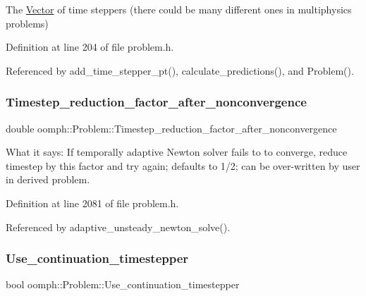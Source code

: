 The \hyperlink{classoomph_1_1Vector}{Vector} of time steppers (there could be many different ones in multiphysics problems) 



Definition at line 204 of file problem.\+h.



Referenced by add\+\_\+time\+\_\+stepper\+\_\+pt(), calculate\+\_\+predictions(), and Problem().

\mbox{\label{classoomph_1_1Problem_a359d1936bc2146e0a0ce697776efcf91}} 
\subsubsection{\texorpdfstring{Timestep\+\_\+reduction\+\_\+factor\+\_\+after\+\_\+nonconvergence}{Timestep\_reduction\_factor\_after\_nonconvergence}}
{\footnotesize\ttfamily double oomph\+::\+Problem\+::\+Timestep\+\_\+reduction\+\_\+factor\+\_\+after\+\_\+nonconvergence\hspace{0.3cm}{\ttfamily [protected]}}



What it says\+: If temporally adaptive Newton solver fails to to converge, reduce timestep by this factor and try again; defaults to 1/2; can be over-\/written by user in derived problem. 



Definition at line 2081 of file problem.\+h.



Referenced by adaptive\+\_\+unsteady\+\_\+newton\+\_\+solve().

\mbox{\label{classoomph_1_1Problem_adbecce0cb1bd7b6b21285568e41ee3eb}} 
\subsubsection{\texorpdfstring{Use\+\_\+continuation\+\_\+timestepper}{Use\_continuation\_timestepper}}
{\footnotesize\ttfamily bool oomph\+::\+Problem\+::\+Use\+\_\+continuation\+\_\+timestepper\hspace{0.3cm}{\ttfamily [protected]}}



